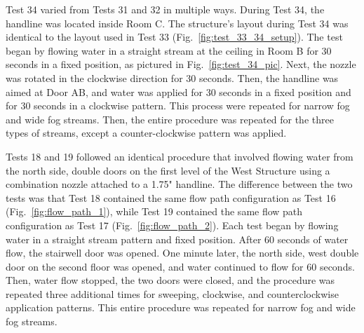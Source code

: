 \documentclass[12pt,oneside]{book}
\begin{document}
Test 34 varied from Tests 31 and 32 in multiple ways. During Test 34, the handline was located inside Room C. The structure's layout during Test 34 was identical to the layout used in Test 33 (Fig.~\ref{fig:test_33_34_setup}). The test began by flowing water in a straight stream at the ceiling in Room B for 30 seconds in a fixed position, as pictured in Fig.~\ref{fig:test_34_pic}. Next, the nozzle was rotated in the clockwise direction for 30 seconds. Then, the handline was aimed at Door AB, and water was applied for 30 seconds in a fixed position and for 30 seconds in a clockwise pattern. This process were repeated for narrow fog and wide fog streams. Then, the entire procedure was repeated for the three types of streams, except a counter-clockwise pattern was applied.

Tests 18 and 19 followed an identical procedure that involved flowing water from the north side, double doors on the first level of the West Structure using a combination nozzle attached to a 1.75" handline. The difference between the two tests was that Test 18 contained the same flow path configuration as Test 16 (Fig.~\ref{fig:flow_path_1}), while Test 19 contained the same flow path configuration as Test 17 (Fig.~\ref{fig:flow_path_2}). Each test began by flowing water in a straight stream pattern and fixed position. After 60 seconds of water flow, the stairwell door was opened. One minute later, the north side, west double door on the second floor was opened, and water continued to flow for 60 seconds. Then, water flow stopped, the two doors were closed, and the procedure was repeated three additional times for sweeping, clockwise, and counterclockwise application patterns. This entire procedure was repeated for narrow fog and wide fog streams.
\end{document}
